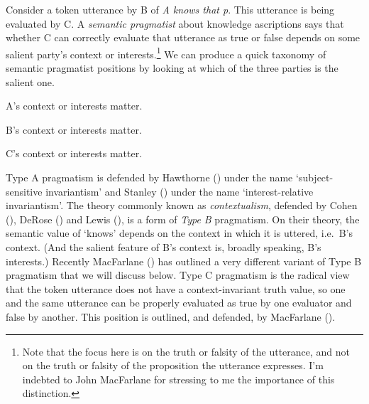 \documentclass[
  10pt,
  letterpaper,
  DIV=11,
  numbers=noendperiod,
  twoside]{scrartcl}
\providecommand{\tightlist}{%
  \setlength{\itemsep}{0pt}\setlength{\parskip}{0pt}}\usepackage{longtable,booktabs,array}
\begin{document}
Consider a token utterance by B of \emph{A knows that p}. This utterance
is being evaluated by C. A \emph{semantic pragmatist} about knowledge
ascriptions says that whether C can correctly evaluate that utterance as
true or false depends on some salient party's context or
interests.\footnote{Note that the focus here is on the truth or falsity
  of the utterance, and not on the truth or falsity of the proposition
  the utterance expresses. I'm indebted to John MacFarlane for stressing
  to me the importance of this distinction.} We can produce a quick
taxonomy of semantic pragmatist positions by looking at which of the
three parties is the salient one.

\begin{description}
\tightlist
\item[Type A pragmatism]
A's context or interests matter.
\item[Type B pragmatism]
B's context or interests matter.
\item[Type C pragmatism]
C's context or interests matter.
\end{description}

Type A pragmatism is defended by Hawthorne
() under the name `subject-sensitive
invariantism' and Stanley ()
under the name `interest-relative invariantism'. The theory commonly
known as \emph{contextualism}, defended by Cohen
(), DeRose
() and Lewis
(), is a form of \emph{Type B}
pragmatism. On their theory, the semantic value of `knows' depends on
the context in which it is uttered, i.e.~B's context. (And the salient
feature of B's context is, broadly speaking, B's interests.) Recently
MacFarlane () has outlined a
very different variant of Type B pragmatism that we will discuss below.
Type C pragmatism is the radical view that the token utterance does not
have a context-invariant truth value, so one and the same utterance can
be properly evaluated as true by one evaluator and false by another.
This position is outlined, and defended, by MacFarlane
().
\end{document}
